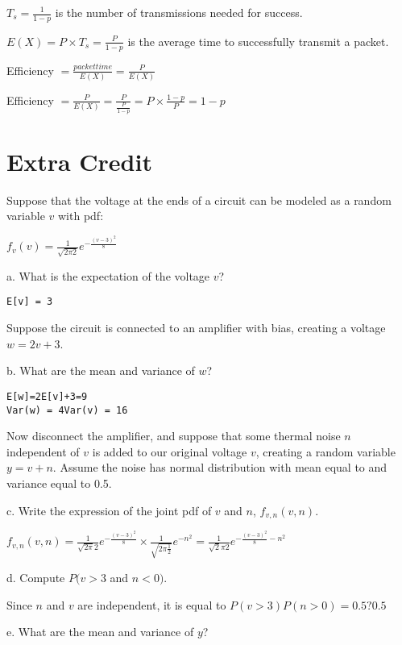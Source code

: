 \documentclass[12pt]{article}
\begin{document}
   $ T_s  = \frac 1 {1-p} $ is the number of transmissions needed for success.  

   $E(X) = P \times T_s  = \frac P {1-p}$ is the average time to successfully transmit a packet.
   
   Efficiency $= \frac{packet time} {E(X)} = \frac{P} {E(X)} $
   
   Efficiency $= \frac{P} {E(X)} = \frac{P} {\frac P {1-p}} = P \times {\frac {1-p} {P}} = 1-p$
   

 \pagebreak
    
        \section*{Extra Credit }  
     Suppose that the voltage at the ends of a circuit can be modeled as a random variable $v$ with pdf:
        
  \begin{center}
   $\displaystyle f_v(v) = \frac 1 {\sqrt{2\pi2}} e^{-\frac {(v-3)^2} {8}}    $
  \end{center}
a. What is the expectation of the voltage $v$?

\begin{verbatim}
E[v] = 3
\end{verbatim}

Suppose the circuit is connected to an amplifier with bias, creating a voltage $w=2v+3$.

b. What are the mean and variance of $w$?
\begin{verbatim}
E[w]=2E[v]+3=9
Var(w) = 4Var(v) = 16
\end{verbatim}

Now disconnect the amplifier, and suppose that some thermal noise $n$ independent of $v$ is added to our original voltage $v$, creating a random variable $y=v+n$. Assume the noise has normal distribution with mean equal to and variance equal to 0.5.

c. Write the expression of the joint pdf of $v$ and $n$, $f_{v,n}(v,n)$.

 $\displaystyle f_{v,n}(v,n) = \frac 1 {\sqrt{2\pi}2} e^{-\frac {(v-3)^2} {8}} \times \frac 1 {\sqrt{2\pi \frac 1 2}} e^{-n^2} = \frac 1 {\sqrt{2}\pi2} e^{-\frac {(v-3)^2} {8} - n^2} $

d. Compute $P(v>3$ and $n<0)$.

Since $n$ and $v$ are independent, it is equal to $P(v>3)P(n>0) = 0.5?0.5$

e. What are the mean and variance of $y$?
\end{document}

